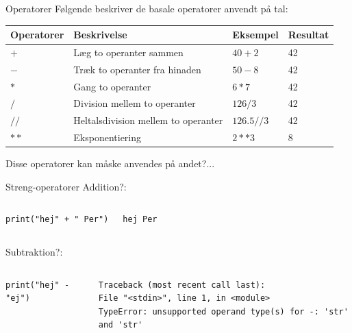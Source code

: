 \documentclass{beamer}
\begin{document}
\begin{frame}[fragile]{Operatorer}
Følgende beskriver de basale operatorer anvendt på tal:
\begin{center}
\begin{tabular}{llll}
\hline
Operatorer			& 		Beskrivelse								&		Eksempel		&		Resultat	\\ \hline \hline
$+$					&		Læg to operanter sammen					&		$40+2$			&		42			\\
$-$					&		Træk to operanter fra hinaden			&		$50-8$			&		42			\\
$*$					&		Gang to operanter 						&		$6*7$			&		42			\\
$/$					&		Division mellem to operanter			&		$126/3$			&		42			\\
$//$				&		Heltalsdivision mellem to operanter		&		$126.5//3$		&		42			\\
$**$				&		Eksponentiering							&		$2**3$			&		8			\\
\end{tabular}
\end{center}
\vfill
\pause Disse operatorer kan måske anvendes på andet?...
\end{frame}


\begin{frame}[fragile]{Streng-operatorer}
Addition?:
\begin{columns}
\begin{lstlisting}[style=python]
print("hej" + " Per")
\end{lstlisting}
\pause
{}
\begin{lstlisting}[style=python]
hej Per
\end{lstlisting}
\end{columns}
\pause
Subtraktion?:
\begin{columns}
\begin{lstlisting}[style=python]
print("hej" - "ej")
\end{lstlisting}
\pause
{}
\begin{lstlisting}[style=python]
Traceback (most recent call last):
File "<stdin>", line 1, in <module>
TypeError: unsupported operand type(s) for -: 'str' and 'str'
\end{lstlisting}
\end{columns}
\end{frame}
\end{document}
